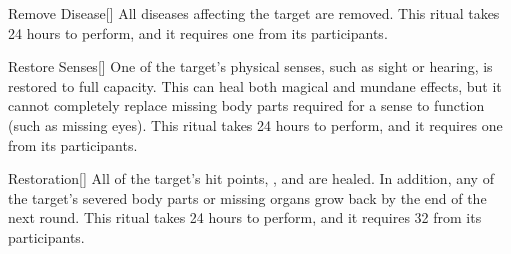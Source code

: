 \lowercase{\hypertarget{spell:Remove Disease}{}}\label{spell:Remove Disease}
\begin{freeability}[Rank 3]{\hypertarget{spell:Remove Disease}{Remove Disease}}[]
All diseases affecting the target are removed.
This ritual takes 24 hours to perform, and it requires one  from its participants.
\end{freeability}
\vspace{0.25em}



\lowercase{\hypertarget{spell:Restore Senses}{}}\label{spell:Restore Senses}
\begin{freeability}[Rank 3]{\hypertarget{spell:Restore Senses}{Restore Senses}}[]
One of the target's physical senses, such as sight or hearing, is restored to full capacity.
This can heal both magical and mundane effects, but it cannot completely replace missing body parts required for a sense to function (such as missing eyes).
This ritual takes 24 hours to perform, and it requires one  from its participants.
\end{freeability}
\vspace{0.25em}



\lowercase{\hypertarget{spell:Restoration}{}}\label{spell:Restoration}
\begin{freeability}[Rank 4]{\hypertarget{spell:Restoration}{Restoration}}[]
All of the target's hit points, , and  are healed.
In addition, any of the target's severed body parts or missing organs grow back by the end of the next round.
This ritual takes 24 hours to perform, and it requires 32  from its participants.
\end{freeability}
\vspace{0.25em}



